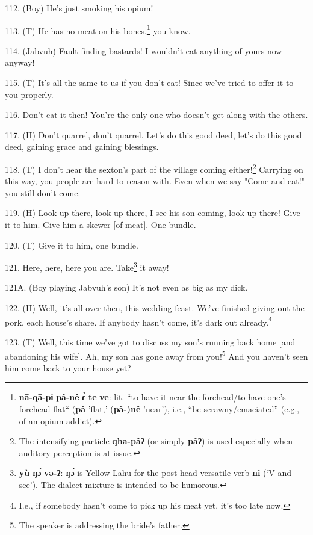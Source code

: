 112. (Boy) He's just smoking his opium!

113. (T) He has no meat on his bones,\footnote{\textbf{nā-qā-pɨ} \textbf{pâ-nê} \textbf{ɛ̀} \textbf{te} \textbf{ve}: lit. ``to have it near the forehead/to have one's forehead flat`` (\textbf{pâ} 'flat,' (\textbf{pâ-)nê} 'near'), i.e., ``be scrawny/emaciated'' (e.g., of an opium addict).} you know.


114. (Jabvuh) Fault-finding bastards! I wouldn't eat anything of yours now anyway!

115. (T) It's all the same to us if you don't eat! Since we've tried to offer it
to you properly.

116. Don't eat it then! You're the only one who doesn't get along with the others.

117. (H) Don't quarrel, don't quarrel. Let's do this good deed, let's do this good
deed, gaining grace and gaining blessings.

118. (T) I don't hear the sexton's part of the village coming either!\footnote{The intensifying particle \textbf{qha-pâʔ} (or simply \textbf{pâʔ}) is used especially when auditory perception is at issue.} Carrying
on this way, you people are hard to reason with. Even when we say "Come
and eat!" you still don't come.

119. (H) Look up there, look up there, I see his son coming, look up there! Give
it to him. Give him a skewer [of meat]. One bundle.

120. (T) Give it to him, one bundle.

121. Here, here, here you are. Take\footnote{\textbf{yù} \textbf{ŋɔ́} \textbf{və-ʔ}: \textbf{ŋɔ́} is Yellow Lahu for the post-head versatile verb \textbf{ni} (`V and see'). The dialect mixture is intended to be humorous.} it away!

121A. (Boy playing Jabvuh's son) It's not even as big as my dick. 

122. (H) Well, it's all over then, this wedding-feast. We've finished giving out
the pork, each house's share. If anybody hasn't come, it's dark out already.\footnote{I.e., if somebody hasn't come to pick up his meat yet, it's too late now.}

\begin{center}
\end{center}

123. (T) Well, this time we've got to discuss my son's running back home [and abandoning
his wife]. Ah, my son has gone away from you!\footnote{The speaker is addressing the bride's father.} And you haven't seen him come
back to your house yet?

